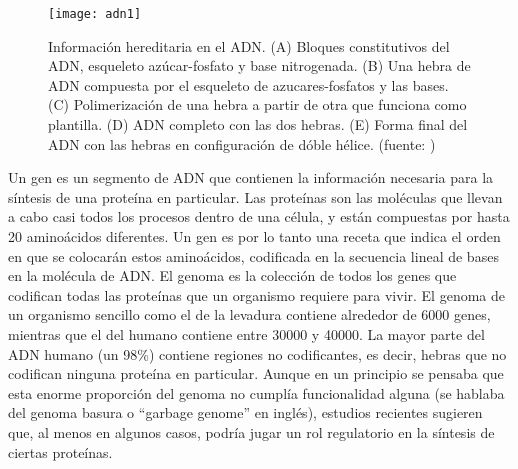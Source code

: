 \begin{figure}[h]
    \centering
    \texttt{[image: adn1]}
    \caption{Información hereditaria en el ADN. (A) Bloques constitutivos del ADN, esqueleto azúcar-fosfato y base nitrogenada. (B) Una hebra de ADN compuesta por el esqueleto de azucares-fosfatos y las bases. (C) Polimerización de una hebra a partir de otra que funciona como plantilla. (D) ADN completo con las dos hebras. (E) Forma final del ADN con las hebras en configuración de dóble hélice. (fuente: \cite{Alberts2015})}
    \label{fig:adn1}
\end{figure}
Un gen es un segmento de ADN que contienen la información necesaria para la síntesis de una proteína en particular. Las proteínas son las moléculas que llevan a cabo casi todos los procesos dentro de una célula, y están compuestas por hasta 20 aminoácidos diferentes. Un gen es por lo tanto una receta que indica el orden en que se colocarán estos aminoácidos, codificada en la secuencia lineal de bases en la molécula de ADN. El genoma es la colección de todos los genes que codifican todas las proteínas que un organismo requiere para vivir. El genoma de un organismo sencillo como el de la levadura contiene alrededor de 6000 genes, mientras que el del humano contiene entre 30000 y 40000. La mayor parte del ADN humano (un 98\%) contiene regiones no codificantes, es decir, hebras que no codifican ninguna proteína en particular. Aunque en un principio se pensaba que esta enorme proporción del genoma no cumplía funcionalidad alguna (se hablaba del genoma basura o ``garbage genome'' en inglés), estudios recientes sugieren que, al menos en algunos casos, podría jugar un rol regulatorio en la síntesis de ciertas proteínas.\\

